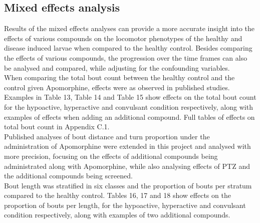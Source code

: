 \documentclass[a4paper,12pt]{article}
\begin{document}
\subsection{Mixed effects analysis}
Results of the mixed effects analyses can provide a more accurate insight into the effects of various compounds on the locomotor phenotypes of the healthy and disease induced larvae when compared to the healthy control. Besides comparing the effects of various compounds, the progression over the time frames can also be analysed and compared, while adjusting for the confounding variables.\\
When comparing the total bout count between the healthy control and the control given Apomorphine, effects were as observed in published studies\cite{ref17}. Examples in Table 13, Table 14 and Table 15 show effects on the total bout count for the hypoactive, hyperactive and convulsant condition respectively, along with examples of effects when adding an additional compound. Full tables of effects on total bout count in Appendix C.1.
\\Published analyses of bout distance and turn proportion under the administration of Apomorphine\cite{ref17} were extended in this project and analysed with more precision, focusing on the effects of additional compounds being administrated along with Apomorphine, while also analysing effects of PTZ and the additional compounds being screened.\\
Bout length was stratified in six classes and the proportion of bouts per stratum compared to the healthy control. Tables 16, 17 and 18 show effects on the proportion of bouts per length, for the hypoactive, hyperactive and convulsant condition respectively, along with examples of two additional compounds.
\end{document}
